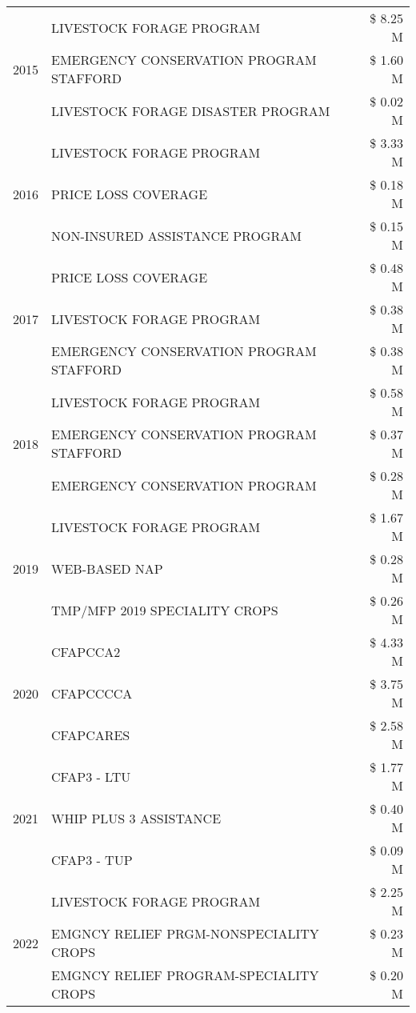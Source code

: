 \begin{tabular}{llr}
\cline{1-3}
\multirow[t]{3}{*}{2015} & LIVESTOCK FORAGE PROGRAM & \$ 8.25 M \\
 & EMERGENCY CONSERVATION PROGRAM STAFFORD & \$ 1.60 M \\
 & LIVESTOCK FORAGE DISASTER PROGRAM & \$ 0.02 M \\
\cline{1-3}
\multirow[t]{3}{*}{2016} & LIVESTOCK FORAGE PROGRAM & \$ 3.33 M \\
 & PRICE LOSS COVERAGE & \$ 0.18 M \\
 & NON-INSURED ASSISTANCE PROGRAM & \$ 0.15 M \\
\cline{1-3}
\multirow[t]{3}{*}{2017} & PRICE LOSS COVERAGE & \$ 0.48 M \\
 & LIVESTOCK FORAGE PROGRAM & \$ 0.38 M \\
 & EMERGENCY CONSERVATION PROGRAM STAFFORD & \$ 0.38 M \\
\cline{1-3}
\multirow[t]{3}{*}{2018} & LIVESTOCK FORAGE PROGRAM & \$ 0.58 M \\
 & EMERGENCY CONSERVATION PROGRAM STAFFORD & \$ 0.37 M \\
 & EMERGENCY CONSERVATION PROGRAM & \$ 0.28 M \\
\cline{1-3}
\multirow[t]{3}{*}{2019} & LIVESTOCK FORAGE PROGRAM & \$ 1.67 M \\
 & WEB-BASED NAP & \$ 0.28 M \\
 & TMP/MFP 2019 SPECIALITY CROPS & \$ 0.26 M \\
\cline{1-3}
\multirow[t]{3}{*}{2020} & CFAPCCA2 & \$ 4.33 M \\
 & CFAPCCCCA & \$ 3.75 M \\
 & CFAPCARES & \$ 2.58 M \\
\cline{1-3}
\multirow[t]{3}{*}{2021} & CFAP3 - LTU & \$ 1.77 M \\
 & WHIP PLUS 3 ASSISTANCE & \$ 0.40 M \\
 & CFAP3 - TUP & \$ 0.09 M \\
\cline{1-3}
\multirow[t]{3}{*}{2022} & LIVESTOCK FORAGE PROGRAM & \$ 2.25 M \\
 & EMGNCY RELIEF PRGM-NONSPECIALITY CROPS & \$ 0.23 M \\
 & EMGNCY RELIEF PROGRAM-SPECIALITY CROPS & \$ 0.20 M \\
\cline{1-3}
\bottomrule
\end{tabular}
